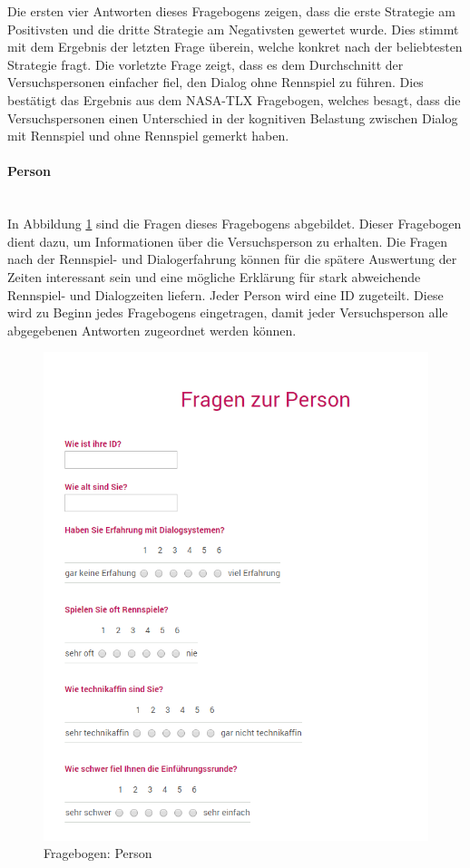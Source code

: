 \documentclass[12pt,a4paper]{scrartcl}
\begin{document}
Die ersten vier Antworten dieses Fragebogens zeigen, dass die erste Strategie am Positivsten und die dritte Strategie am Negativsten gewertet wurde. Dies stimmt mit dem Ergebnis der letzten Frage überein, welche konkret nach der beliebtesten Strategie fragt. \newline \newline Die vorletzte Frage zeigt, dass es dem Durchschnitt der Versuchspersonen einfacher fiel, den Dialog ohne Rennspiel zu führen. Dies bestätigt das Ergebnis aus dem NASA-TLX Fragebogen, welches besagt, dass die Versuchspersonen einen Unterschied in der kognitiven Belastung zwischen Dialog mit Rennspiel und ohne Rennspiel gemerkt haben.  

\paragraph{Person}
\label{fbperson1}
~\\
In Abbildung \ref{fbperson} sind die Fragen dieses Fragebogens abgebildet. Dieser Fragebogen dient dazu, um Informationen über die Versuchsperson zu erhalten.
Die Fragen nach der Rennspiel- und Dialogerfahrung können für die spätere Auswertung der Zeiten interessant sein und eine mögliche Erklärung für stark abweichende Rennspiel- und Dialogzeiten liefern. \newline \newline
Jeder Person wird eine ID zugeteilt. Diese wird zu Beginn jedes Fragebogens eingetragen, damit jeder Versuchsperson alle abgegebenen Antworten zugeordnet werden können. 

\begin{figure}[H]
\begin{center}
\includegraphics[width=12cm]{fbperson.png}
\caption{Fragebogen: Person}
\label{fbperson}
\end{center}
\end{figure}
\newpage
\end{document}
